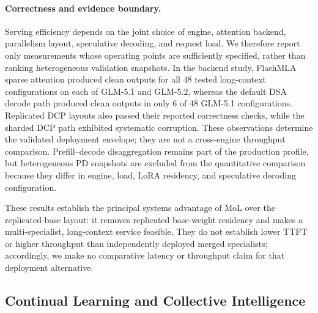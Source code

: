 \paragraph{Correctness and evidence boundary.}
Serving efficiency depends on the joint choice of engine, attention backend,
parallelism layout, speculative decoding, and request load. We therefore report
only measurements whose operating points are sufficiently specified, rather
than ranking heterogeneous validation snapshots. In the backend study,
FlashMLA sparse attention produced clean outputs for all 48 tested long-context
configurations on each of GLM-5.1 and GLM-5.2, whereas the default DSA decode
path produced clean outputs in only 6 of 48 GLM-5.1 configurations. Replicated
DCP layouts also passed their reported correctness checks, while the sharded
DCP path exhibited systematic corruption. These observations determine the
validated deployment envelope; they are not a cross-engine throughput
comparison. Prefill--decode disaggregation remains part of the production
profile, but heterogeneous PD snapshots are excluded from the quantitative
comparison because they differ in engine, load, LoRA residency, and speculative
decoding configuration.

These results establish the principal systems advantage of MoL over the
replicated-base layout: it removes replicated base-weight residency and makes a
multi-specialist, long-context service feasible. They do not establish lower
TTFT or higher throughput than independently deployed merged specialists;
accordingly, we make no comparative latency or throughput claim for that
deployment alternative.

\subsection{Continual Learning and Collective Intelligence}
\label{sec:mol_continual}
\label{sec:mol_collective}

